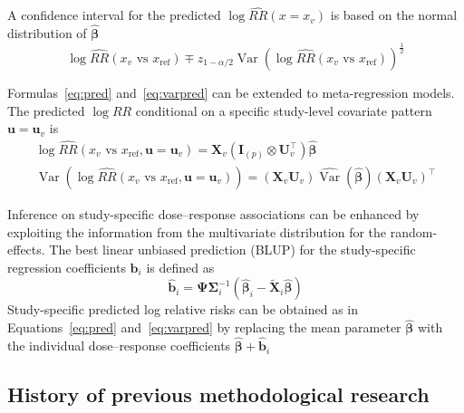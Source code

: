 \documentclass[11pt,a4paper,twoside,openany]{book}\usepackage{knitr}
\DeclareMathOperator{\Var}{Var}
\begin{document}
{{\noindent A confidence interval for the predicted $\log \widehat{RR}(x = x_v)$ is based on the normal distribution of $\boldsymbol{\hat \beta}$
\begin{equation*}
\log \widehat{RR}(x_v \text{ vs } x_\mathrm{ref}) \mp z_{1- \alpha/2} \Var \left(\log \widehat{RR}(x_v \text{ vs } x_\mathrm{ref}) \right)^{\frac{1}{2}}
\label{eq:pred_ci}
\end{equation*}

\noindent Formulas~\ref{eq:pred} and~\ref{eq:varpred} can be extended to meta-regression models. The predicted $\log RR$ conditional on a specific study-level covariate pattern $\mathbf{u} = \mathbf{u}_v$ is
\begin{align}
\log \widehat{RR}\left(x_v \text{ vs } x_\mathrm{ref}, \mathbf{u} = \mathbf{u}_v  \right)= \mathbf{X}_v \left(\mathbf{I}_{(p)} \otimes \mathbf{U}_v^\top \right) \boldsymbol{\hat \beta}  \label{eq:pred_mr} \\
\Var \left(\log \widehat{RR}\left(x_v \text{ vs } x_\mathrm{ref}, \mathbf{u}= \mathbf{u}_v \right) \right) = \left( \mathbf{X}_v \mathbf{U}_v\right) \widehat{\Var} \left( \boldsymbol{\hat \beta} \right) \left( \mathbf{X}_v \mathbf{U}_v\right)^\top \label{eq:varpred_mr}
\end{align}

Inference on study-specific dose--response associations can be enhanced by exploiting the information from the multivariate distribution for the random-effects. The best linear unbiased prediction (BLUP) for the study-specific regression coefficients $\mathbf{b}_i$ is defined as
\begin{equation}
\boldsymbol{\hat b}_i = \boldsymbol{\Psi} \boldsymbol{\Sigma}_i^{-1} \left(\boldsymbol{\hat \beta}_i - \widetilde{\mathbf{X}}_i \boldsymbol{\hat \beta} \right)
\label{eq:blup_ts}
\end{equation}
\noindent Study-specific predicted log relative risks can be obtained as in Equations~\ref{eq:pred} and~\ref{eq:varpred} by replacing the mean parameter $\boldsymbol{\hat \beta}$ with the individual dose--response coefficients $\boldsymbol{\hat \beta} + \boldsymbol{\hat b}_i$ 


\subsection{History of previous methodological research}

}}
\end{document}
